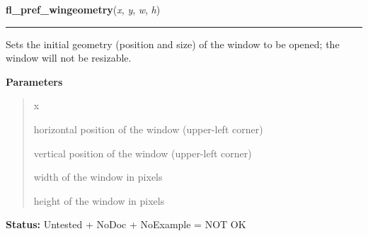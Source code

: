 \hspace{.8\funcindent}\begin{boxedminipage}{\funcwidth}

    \raggedright \textbf{fl\_pref\_wingeometry}(\textit{x}, \textit{y}, \textit{w}, \textit{h})

    \vspace{-1.5ex}

    \rule{\textwidth}{0.5\fboxrule}
\setlength{\parskip}{2ex}
    Sets the initial geometry (position and size) of the window to be 
    opened; the window will not be resizable.

\setlength{\parskip}{1ex}
      \textbf{Parameters}
      \vspace{-1ex}

      \begin{quote}
        \begin{Ventry}{x}

          \item[x]

          horizontal position of the window (upper-left corner)

          \item[y]

          vertical position of the window (upper-left corner)

          \item[w]

          width of the window in pixels

          \item[h]

          height of the window in pixels

        \end{Ventry}

      \end{quote}

\textbf{Status:} Untested + NoDoc + NoExample = NOT OK



    \end{boxedminipage}

    \label{xformslib:library:fl_initial_wingeometry}

    \vspace{0.5ex}

